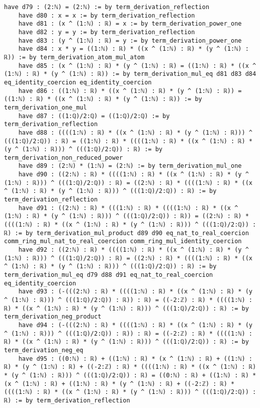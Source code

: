 \documentclass{article}
\begin{document}
\begin{tcolorbox}[colback=white!10, width=\linewidth]
\begin{lstlisting}[language=Lean4]
    have d79 : (2:ℕ) = (2:ℕ) := by term_derivation_reflection
    have d80 : x = x := by term_derivation_reflection
    have d81 : (x ^ (1:ℕ) : ℝ) = x := by term_derivation_power_one
    have d82 : y = y := by term_derivation_reflection
    have d83 : (y ^ (1:ℕ) : ℝ) = y := by term_derivation_power_one
    have d84 : x * y = ((1:ℕ) : ℝ) * ((x ^ (1:ℕ) : ℝ) * (y ^ (1:ℕ) : ℝ)) := by term_derivation_atom_mul_atom
    have d85 : (x ^ (1:ℕ) : ℝ) * (y ^ (1:ℕ) : ℝ) = ((1:ℕ) : ℝ) * ((x ^ (1:ℕ) : ℝ) * (y ^ (1:ℕ) : ℝ)) := by term_derivation_mul_eq d81 d83 d84 eq_identity_coercion eq_identity_coercion
    have d86 : ((1:ℕ) : ℝ) * ((x ^ (1:ℕ) : ℝ) * (y ^ (1:ℕ) : ℝ)) = ((1:ℕ) : ℝ) * ((x ^ (1:ℕ) : ℝ) * (y ^ (1:ℕ) : ℝ)) := by term_derivation_one_mul
    have d87 : ((1:ℚ)/2:ℚ) = ((1:ℚ)/2:ℚ) := by term_derivation_reflection
    have d88 : ((((1:ℕ) : ℝ) * ((x ^ (1:ℕ) : ℝ) * (y ^ (1:ℕ) : ℝ))) ^ (((1:ℚ)/2:ℚ)) : ℝ) = ((1:ℕ) : ℝ) * ((((1:ℕ) : ℝ) * ((x ^ (1:ℕ) : ℝ) * (y ^ (1:ℕ) : ℝ))) ^ (((1:ℚ)/2:ℚ)) : ℝ) := by term_derivation_non_reduced_power
    have d89 : (2:ℕ) * (1:ℕ) = (2:ℕ) := by term_derivation_mul_one
    have d90 : ((2:ℕ) : ℝ) * ((((1:ℕ) : ℝ) * ((x ^ (1:ℕ) : ℝ) * (y ^ (1:ℕ) : ℝ))) ^ (((1:ℚ)/2:ℚ)) : ℝ) = ((2:ℕ) : ℝ) * ((((1:ℕ) : ℝ) * ((x ^ (1:ℕ) : ℝ) * (y ^ (1:ℕ) : ℝ))) ^ (((1:ℚ)/2:ℚ)) : ℝ) := by term_derivation_reflection
    have d91 : ((2:ℕ) : ℝ) * (((1:ℕ) : ℝ) * ((((1:ℕ) : ℝ) * ((x ^ (1:ℕ) : ℝ) * (y ^ (1:ℕ) : ℝ))) ^ (((1:ℚ)/2:ℚ)) : ℝ)) = ((2:ℕ) : ℝ) * ((((1:ℕ) : ℝ) * ((x ^ (1:ℕ) : ℝ) * (y ^ (1:ℕ) : ℝ))) ^ (((1:ℚ)/2:ℚ)) : ℝ) := by term_derivation_mul_product d89 d90 eq_nat_to_real_coercion comm_ring_mul_nat_to_real_coercion comm_ring_mul_identity_coercion
    have d92 : ((2:ℕ) : ℝ) * ((((1:ℕ) : ℝ) * ((x ^ (1:ℕ) : ℝ) * (y ^ (1:ℕ) : ℝ))) ^ (((1:ℚ)/2:ℚ)) : ℝ) = ((2:ℕ) : ℝ) * ((((1:ℕ) : ℝ) * ((x ^ (1:ℕ) : ℝ) * (y ^ (1:ℕ) : ℝ))) ^ (((1:ℚ)/2:ℚ)) : ℝ) := by term_derivation_mul_eq d79 d88 d91 eq_nat_to_real_coercion eq_identity_coercion
    have d93 : (-(((2:ℕ) : ℝ) * ((((1:ℕ) : ℝ) * ((x ^ (1:ℕ) : ℝ) * (y ^ (1:ℕ) : ℝ))) ^ (((1:ℚ)/2:ℚ)) : ℝ)) : ℝ) = ((-2:ℤ) : ℝ) * ((((1:ℕ) : ℝ) * ((x ^ (1:ℕ) : ℝ) * (y ^ (1:ℕ) : ℝ))) ^ (((1:ℚ)/2:ℚ)) : ℝ) := by term_derivation_neg_product
    have d94 : (-(((2:ℕ) : ℝ) * ((((1:ℕ) : ℝ) * ((x ^ (1:ℕ) : ℝ) * (y ^ (1:ℕ) : ℝ))) ^ (((1:ℚ)/2:ℚ)) : ℝ)) : ℝ) = ((-2:ℤ) : ℝ) * ((((1:ℕ) : ℝ) * ((x ^ (1:ℕ) : ℝ) * (y ^ (1:ℕ) : ℝ))) ^ (((1:ℚ)/2:ℚ)) : ℝ) := by term_derivation_neg_eq
    have d95 : ((0:ℕ) : ℝ) + ((1:ℕ) : ℝ) * (x ^ (1:ℕ) : ℝ) + ((1:ℕ) : ℝ) * (y ^ (1:ℕ) : ℝ) + ((-2:ℤ) : ℝ) * ((((1:ℕ) : ℝ) * ((x ^ (1:ℕ) : ℝ) * (y ^ (1:ℕ) : ℝ))) ^ (((1:ℚ)/2:ℚ)) : ℝ) = ((0:ℕ) : ℝ) + ((1:ℕ) : ℝ) * (x ^ (1:ℕ) : ℝ) + ((1:ℕ) : ℝ) * (y ^ (1:ℕ) : ℝ) + ((-2:ℤ) : ℝ) * ((((1:ℕ) : ℝ) * ((x ^ (1:ℕ) : ℝ) * (y ^ (1:ℕ) : ℝ))) ^ (((1:ℚ)/2:ℚ)) : ℝ) := by term_derivation_reflection

\end{lstlisting}
\end{tcolorbox}
\end{document}
